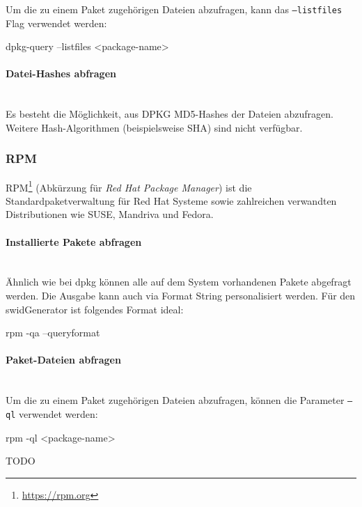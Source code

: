 \noindent Um die zu einem Paket zugehörigen Dateien abzufragen, kann das
\texttt{---listfiles} Flag verwendet werden:

\begin{bashcode}
dpkg-query --listfiles <package-name>
\end{bashcode}

\paragraph{Datei-Hashes abfragen} \hspace{0pt} \\

\noindent Es besteht die Möglichkeit, aus DPKG MD5-Hashes der Dateien abzufragen. Weitere
Hash-Algorithmen (beispielsweise SHA) sind nicht verfügbar.


\subsubsection{RPM}

RPM\footnote{\url{https://rpm.org}} (Abkürzung für
\textit{Red Hat Package Manager}) ist die Standardpaketverwaltung für Red Hat Systeme sowie zahlreichen verwandten Distributionen wie SUSE, Mandriva und Fedora.

\paragraph{Installierte Pakete abfragen} \hspace{0pt} \\

\noindent Ähnlich wie bei dpkg können alle auf dem System vorhandenen Pakete abgefragt werden. Die Ausgabe kann auch via Format String personalisiert werden. Für den swidGenerator ist folgendes Format ideal:

\begin{bashcode}
rpm -qa --queryformat %
\end{bashcode}

\paragraph{Paket-Dateien abfragen} \hspace{0pt} \\

\noindent Um die zu einem Paket zugehörigen Dateien abzufragen, können die Parameter \texttt{--ql} verwendet werden:

\begin{bashcode}
rpm -ql <package-name>
\end{bashcode}

\noindent TODO
